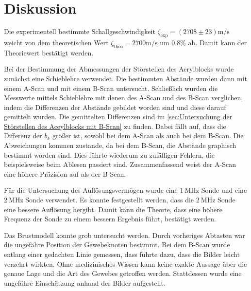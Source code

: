 \section{Diskussion}
\label{sec:diskussion}

Die experimentell bestimmte Schallgeschwindigkeit $\zeta_{\text{exp}} = \left(2708 \pm 23\right) \si{\meter \per \second}$ weicht von dem 
theoretischen Wert $\zeta_{\text{theo}} = 2700 \si{\meter \per \second}$ \cite{scan} um $0.8 \%$ ab. Damit kann der Theoriewert bestätigt werden.

Bei der Bestimmung der Abmessungen der Störstellen des Acrylblocks wurde zunächst eine Schieblehre verwendet. Die bestimmten Abstände
wurden dann mit einem A-Scan und mit einem B-Scan untersucht. Schließlich wurden die Messwerte mittels Schieblehre mit denen des A-Scan und des 
B-Scan verglichen, indem die Differenzen der Abstände gebildet worden sind und diese darauf gemittelt wurden. Die gemittelten Differenzen 
sind im \autoref{sec:Untersuchung der Störstellen des Aceylblocks mit B-Scan} zu finden.
Dabei fällt auf, dass die Differenz der $b_k$ größer ist, sowohl bei dem A-Scan als auch bei dem B-Scan.
Die Abweichungen kommen zustande, da bei dem B-Scan, die Abstände graphisch bestimmt worden sind. Dies führte wiederum zu zufälligen Fehlern, die beispielsweise
beim Ablesen passiert sind. Zusammenfassend weist der A-Scan eine höhere Präzision auf als der B-Scan.

Für die Untersuchung des Auflösungsvermögen wurde eine $\SI{1}{\mega\hertz}$ Sonde und eine $\SI{2}{\mega\hertz}$ Sonde verwendet. 
Es konnte festgestellt werden, dass die $\SI{2}{\mega\hertz}$ Sonde eine bessere Auflösung hergibt.
Damit kann die Theorie, dass eine höhere Frequenz der Sonde zu einem bessern Ergebnis führt, bestätigt werden.

Das Brustmodell konnte grob untersucht werden. Durch vorheriges Abtasten war die ungefähre Position der Gewebeknoten bestimmt.
Bei dem B-Scan wurde entlang einer gedachten Linie gemessen, dass führte dazu, dass die Bilder leicht verzehrt wirkten. Ohne medizinisches Wissen 
kann keine exakte Aussage über die genaue Lage und die Art des Gewebes getroffen werden. Stattdessen wurde eine ungefähre Einschätzung anhand der Bilder 
aufgestellt.
